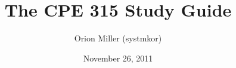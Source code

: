\documentclass[10pt, letterpaper]{article}
\title{The CPE 315 Study Guide}
\author{Orion Miller (systmkor)}
\date{November 26, 2011}
\begin{document}
\maketitle

\pagebreak
\tableofcontents
\pagebreak






\end{document}
